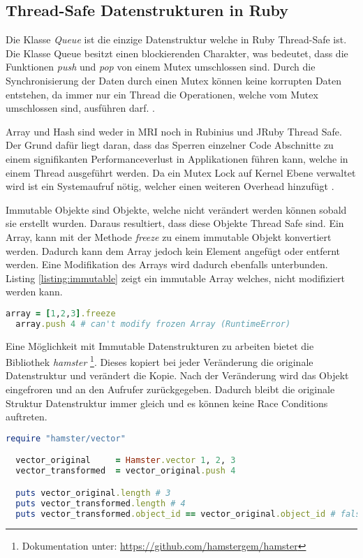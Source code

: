 \subsection{Thread-Safe Datenstrukturen in Ruby}
Die Klasse \emph{Queue} ist die einzige Datenstruktur welche in Ruby Thread-Safe ist. Die Klasse Queue besitzt einen blockierenden Charakter, was bedeutet, dass die Funktionen \emph{push} und \emph{pop} von einem Mutex umschlossen sind. Durch die Synchronisierung der Daten durch einen Mutex können keine korrupten Daten entstehen, da immer nur ein Thread die Operationen, welche vom Mutex umschlossen sind, ausführen darf. \cite[p. 110]{Sto2013}. 

Array und Hash sind weder in MRI noch in Rubinius und JRuby Thread Safe. Der Grund dafür liegt daran, dass das Sperren einzelner Code Abschnitte zu einem signifikanten Performanceverlust in Applikationen führen kann, welche in einem Thread ausgeführt werden. Da ein Mutex Lock auf Kernel Ebene verwaltet wird ist ein Systemaufruf nötig, welcher einen weiteren Overhead hinzufügt \cite[p. 110]{Sto2013}.

Immutable Objekte sind Objekte, welche nicht verändert werden können sobald sie erstellt wurden. Daraus resultiert, dass diese Objekte Thread Safe sind. Ein Array, kann mit der Methode \emph{freeze} zu einem immutable Objekt konvertiert werden. Dadurch kann dem Array jedoch kein Element angefügt oder entfernt werden. Eine Modifikation des Arrays wird dadurch ebenfalls unterbunden. Listing \ref{listing:immutable} zeigt ein immutable Array welches, nicht modifiziert werden kann. 

\begin{lstlisting}[language=Ruby,label={listing:immutable}]
  array = [1,2,3].freeze
  array.push 4 # can't modify frozen Array (RuntimeError)
\end{lstlisting}

Eine Möglichkeit mit Immutable Datenstrukturen zu arbeiten bietet die Bibliothek \emph{hamster} \footnote{Dokumentation unter: \url{https://github.com/hamstergem/hamster}}. Dieses kopiert bei jeder Veränderung die originale Datenstruktur und verändert die Kopie. Nach der Veränderung wird das Objekt eingefroren und an den Aufrufer zurückgegeben. Dadurch bleibt die originale Struktur Datenstruktur immer gleich und es können keine Race Conditions auftreten. 

\begin{lstlisting}[language=Ruby,label={listing:immuteable hamster}]
  require "hamster/vector"

  vector_original     = Hamster.vector 1, 2, 3
  vector_transformed  = vector_original.push 4

  puts vector_original.length # 3
  puts vector_transformed.length # 4
  puts vector_transformed.object_id == vector_original.object_id # false
\end{lstlisting}

